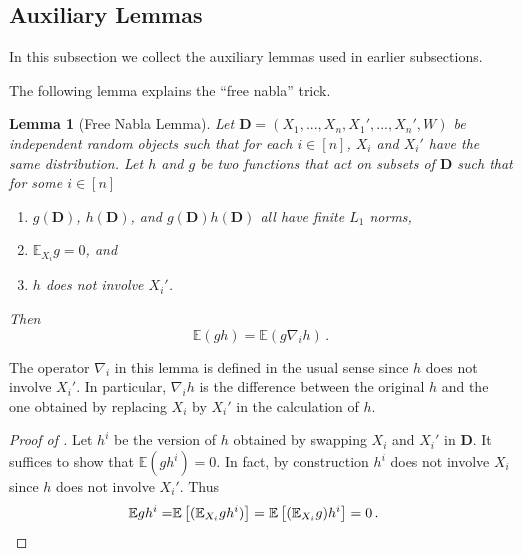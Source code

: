 \documentclass[11pt]{article}
\theoremstyle{plain}
\newtheorem{lemma}[theorem]{Lemma}
\begin{document}
\subsection{Auxiliary Lemmas}\label{subsec:4.4-aux}
In this subsection we collect the auxiliary lemmas used in earlier subsections.

The following lemma explains the ``free nabla'' trick.
\begin{lemma}
    [Free Nabla Lemma]\label{lem:4.4-free-nabla}
    Let $\mathbf D=(X_1,...,X_n,X_1',...,X_n',W)$ be independent random objects such that for each $i\in[n]$, $X_i$ and $X_i'$ have the same distribution. 
    Let $h$ and $g$ be two functions that act on subsets of $\mathbf D$ such that for some $i\in[n]$
    \begin{enumerate}
        \item $g(\mathbf D)$, $h(\mathbf D)$, and $g(\mathbf D)h(\mathbf D)$ all have finite $L_1$ norms,
        \item $\mathbb E_{X_i} g =0$, and
        \item $h$ does not involve $X_i'$.
    \end{enumerate}
    Then
    $$\mathbb E (g h)=\mathbb E(g\nabla_i h)\,.$$
\end{lemma}
The operator $\nabla_i$ in this lemma is defined in the usual sense since $h$ does not involve $X_i'$. In particular, $\nabla_i h$ is the  difference between the original $h$ and the one obtained
by replacing $X_i$ by $X_i'$ in the calculation of $h$.
\begin{proof}
    [Proof of ]
    Let $h^i$ be the version of $h$ obtained by swapping $X_i$ and $X_i'$ in $\mathbf D$. It suffices to show that $\mathbb E (g h^i) = 0$.
    In fact, by construction $h^i$ does not involve $X_i$ since $h$ does not involve $X_i'$.  Thus
    \begin{align*}\mathbb E g h^i=&\mathbb E\left[(\mathbb E_{X_i} g h^i) \right] =\mathbb E\left[(\mathbb E_{X_i} g) h^i\right]=0\,.\qedhere\end{align*}
\end{proof}
\end{document}
